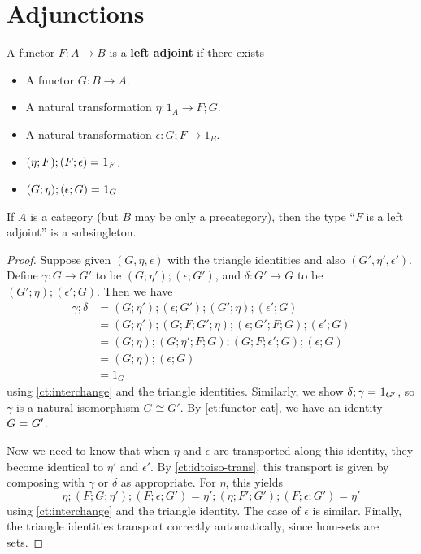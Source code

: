 \section{Adjunctions}
\label{sec:adjunctions}

\begin{defn}
  A functor $F:A\to B$ is a \textbf{left adjoint} if there exists
  \begin{itemize}
  \item A functor $G:B\to A$.
  \item A natural transformation $\eta:1_A \to F;G$.
  \item A natural transformation $\epsilon:G;F\to 1_B$.
  \item $(\eta;F);(F;\epsilon) =_{} 1_F$.
  \item $(G;\eta);(\epsilon;G) =_{} 1_G$.
  \end{itemize}
\end{defn}

\begin{lem}\label{ct:adjprop}
  If $A$ is a category (but $B$ may be only a precategory), then the type ``$F$ is a left adjoint'' is a subsingleton.
\end{lem}
\begin{proof}
  Suppose given $(G,\eta,\epsilon)$ with the triangle identities and also $(G',\eta',\epsilon')$.  Define $\gamma:G\to G'$ to be $(G;\eta');(\epsilon;G')$, and $\delta:G'\to G$ to be $(G';\eta);(\epsilon';G)$.  Then we have
  \begin{align*}
    \gamma;\delta &= (G;\eta');(\epsilon;G');(G';\eta);(\epsilon';G)\\
    &= (G;\eta');(G;F;G';\eta);(\epsilon;G';F;G);(\epsilon';G)\\
    &= (G;\eta);(G;\eta';F;G);(G;F;\epsilon';G);(\epsilon;G)\\
    &= (G;\eta);(\epsilon;G)\\
    &= 1_G
  \end{align*}
  using \autoref{ct:interchange} and the triangle identities.  Similarly, we show $\delta;\gamma =_{} 1_{G'}$, so $\gamma$ is a natural isomorphism $G\cong G'$.  By \autoref{ct:functor-cat}, we have an identity $G =_{} G'$.

  Now we need to know that when $\eta$ and $\epsilon$ are transported along this identity, they become identical to $\eta'$ and $\epsilon'$.  By \autoref{ct:idtoiso-trans}, this transport is given by composing with $\gamma$ or $\delta$ as appropriate.  For $\eta$, this yields
  \begin{equation*}
    \eta;(F;G;\eta');(F;\epsilon;G')
    = \eta';(\eta;F';G');(F;\epsilon;G')
    = \eta'
  \end{equation*}
  using \autoref{ct:interchange} and the triangle identity.  The case of $\epsilon$ is similar.
  Finally, the triangle identities transport correctly automatically, since hom-sets are sets.
\end{proof}

